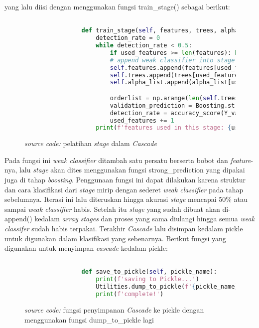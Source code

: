 		yang lalu diisi dengan menggunakan fungsi train\_stage() sebagai berikut:

		\begin{figure}[H]
			\begin{lstlisting}[language=Python, basicstyle=\tiny]

				def train_stage(self, features, trees, alpha_list, X_valid, Y_valid, used_features):
					detection_rate = 0
					while detection_rate < 0.5:
						if used_features >= len(features): break
						# append weak classifier into stage one by one
						self.features.append(features[used_features])
						self.trees.append(trees[used_features])
						self.alpha_list.append(alpha_list[used_features])

						orderlist = np.arange(len(self.trees))
						validation_prediction = Boosting.strong_prediction(self.trees, orderlist, X_valid, self.alpha_list)
						detection_rate = accuracy_score(Y_valid, validation_prediction)
						used_features += 1
					print(f'features used in this stage: {used_features}')

			\end{lstlisting}
			\caption{\emph{source code: } pelatihan \emph{stage} dalam \emph{Cascade}}
			\label{code: train stage function}
		\end{figure}

		Pada fungsi ini \emph{weak classifier} ditambah satu persatu berserta bobot dan 
		\emph{feature}-nya, lalu \emph{stage} akan dites menggunakan fungsi strong\_prediction 
		yang dipakai juga di tahap \emph{boosting}. Penggunaan fungsi ini dapat dilakukan 
		karena struktur dan cara klasifikasi dari \emph{stage} mirip dengan sederet \emph{weak classifier} 
		pada tahap sebelumnya. Iterasi ini lalu diteruskan hingga akurasi \emph{stage} mencapai 50\% 
		atau sampai \emph{weak classifier} habis. Setelah itu \emph{stage} yang sudah dibuat 
		akan di-append() kedalam \textit{array stages} dan proses yang sama diulangi hingga 
		semua \emph{weak classifer} sudah habis terpakai. Terakhir \emph{Cascade} lalu disimpan 
		kedalam pickle untuk digunakan dalam klasifikasi yang sebenarnya. Berikut fungsi yang 
		digunakan untuk menyimpan \emph{cascade} kedalam pickle:

		\begin{figure}[H]
			\begin{lstlisting}[language=Python, basicstyle=\tiny]

				def save_to_pickle(self, pickle_name):
					print(f'saving to Pickle...')
					Utilities.dump_to_pickle(f'{pickle_name}', self)
					print(f'complete!')

			\end{lstlisting}
			\caption{\emph{source code: } fungsi penyimpanan \emph{Cascade} ke pickle 
			dengan menggunakan fungsi dump\_to\_pickle lagi}
			\label{code: save Cascade to pickle}
		\end{figure}

